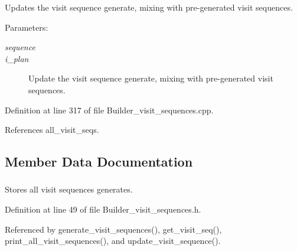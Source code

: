 Updates the visit sequence generate, mixing with pre-generated visit sequences. \begin{Desc}
\item[Parameters:]
\begin{description}
\item[{\em sequence}]\item[{\em i\_\-plan}]Update the visit sequence generate, mixing with pre-generated visit sequences. \end{description}
\end{Desc}


Definition at line 317 of file Builder\_\-visit\_\-sequences.cpp.

References all\_\-visit\_\-seqs.

\subsection{Member Data Documentation}
\hypertarget{classgenevalmag_1_1Builder__visit__sequences_ba229b62df85d994ce9a5da960c1273a}{
\subsubsection[{all\_\-visit\_\-seqs}]{}}
\label{classgenevalmag_1_1Builder__visit__sequences_ba229b62df85d994ce9a5da960c1273a}


Stores all visit sequences generates. 



Definition at line 49 of file Builder\_\-visit\_\-sequences.h.

Referenced by generate\_\-visit\_\-sequences(), get\_\-visit\_\-seq(), print\_\-all\_\-visit\_\-sequences(), and update\_\-visit\_\-sequence().\hypertarget{classgenevalmag_1_1Builder__visit__sequences_2eb7705741cd581ed968e0bc6127b3fd}{
\subsubsection[{attr\_\-grammar}]{}}
\label{classgenevalmag_1_1Builder__visit__sequences_2eb7705741cd581ed968e0bc6127b3fd}



